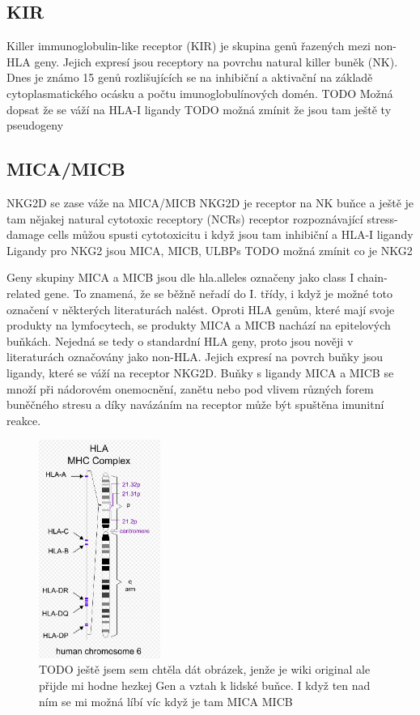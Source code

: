 \documentclass[czech,DP]{thesiskiv}
\begin{document}
\subsection{KIR}
Killer immunoglobulin-like receptor (KIR) je skupina genů řazených mezi non-HLA geny. Jejich expresí jsou receptory na povrchu natural killer buněk (NK). Dnes je známo 15 genů rozlišujících se na inhibiční a aktivační na základě cytoplasmatického ocásku a počtu imunoglobulínových domén. 
TODO Možná dopsat že se váží na HLA-I ligandy
TODO možná zmínit že jsou tam ještě ty pseudogeny


\subsection{MICA/MICB}
NKG2D se zase váže na MICA/MICB
NKG2D je receptor na NK buňce a ještě je tam nějakej natural cytotoxic receptory (NCRs)
receptor rozpoznávající stress-damage cells
můžou spusti cytotoxicitu i když jsou tam inhibiční a HLA-I ligandy
Ligandy pro NKG2 jsou MICA, MICB, ULBPs
TODO možná zmínit co je NKG2

Geny skupiny MICA a MICB jsou dle hla.alleles \cite{imgt_hla_database} označeny jako class I chain-related gene. To znamená, že se běžně neřadí do I. třídy, i když je možné toto označení v některých literaturách nalést. Oproti HLA genům, které mají svoje produkty na lymfocytech, se produkty MICA a MICB nachází na epitelových buňkách. Nejedná se tedy o standardní HLA geny, proto jsou nověji v literaturách označovány jako non-HLA. Jejich expresí na povrch buňky jsou ligandy, které se váží na receptor NKG2D. Buňky s ligandy MICA a MICB se množí při nádorovém onemocnění, zanětu nebo pod vlivem různých forem buněčného stresu a díky navázáním na receptor může být spuštěna imunitní reakce. \cite{transfuzni_lekarstvi} \cite{MIC}
 
\begin{figure}[H]		
		\centering
		\includegraphics[width=150px]{./img/genom6_hla.png}
		\caption{TODO ještě jsem sem chtěla dát obrázek, jenže je wiki original ale přijde mi hodne hezkej Gen a vztah k lidské buňce. I když ten nad ním se mi možná líbí víc když je tam MICA MICB \cite{human_cell}}
		\label{fig:bunka_gen}
\end{figure}
%    
\end{document}
